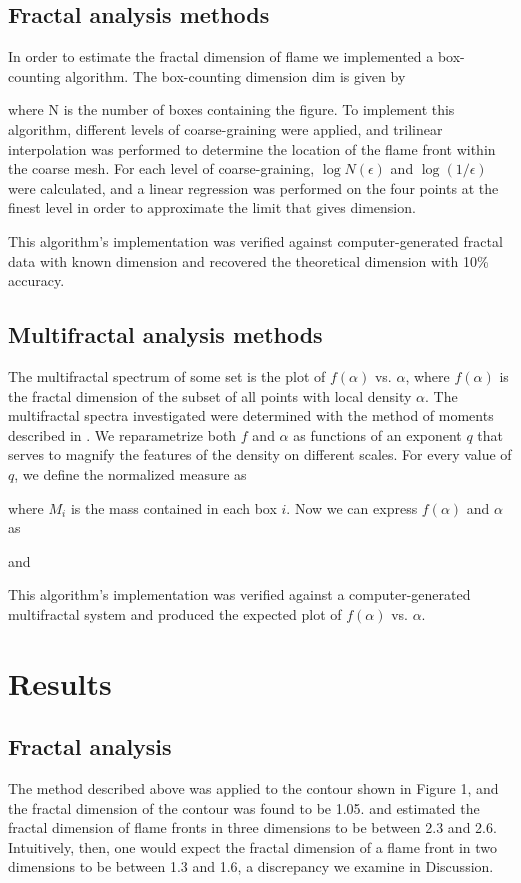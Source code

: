 \documentclass[iop]{emulateapj}
\begin{document}
\subsection{Fractal analysis methods}\label{FractalMethods}
In order to estimate the fractal dimension of flame we implemented a box-counting algorithm. The box-counting dimension $\mathrm{dim}$ is given by

where N is the number of boxes containing the figure.  To implement this algorithm, different levels of coarse-graining were applied, and trilinear interpolation was performed to determine the location of the flame front within the coarse mesh. For each level of coarse-graining, $\log{N(\epsilon)}$ and $\log{(1/\epsilon)}$ were calculated, and a linear regression was performed on the four points at the finest level in order to approximate the limit that gives dimension.

This algorithm’s implementation was verified against computer-generated fractal data with known dimension and recovered the theoretical dimension with 10\% accuracy.

\subsection{Multifractal analysis methods}\label{MultifractalMethods}
The multifractal spectrum of some set is the plot of $f(\alpha)$ vs. $\alpha$, where $f(\alpha)$ is the fractal dimension of the subset of all points with local density $\alpha$. The multifractal spectra investigated were determined with the method of moments described in \cite{Chhabra1989}. We reparametrize both $f$ and $\alpha$ as functions of an exponent $q$ that serves to magnify the features of the density on different scales. For every value of $q$, we define the normalized measure as

where $M_i$ is the mass contained in each box $i$. Now we can express $f(\alpha)$ and $\alpha$ as

and

This algorithm’s implementation was verified against a computer-generated multifractal system and produced the expected plot of $f(\alpha)$ vs. $\alpha$.

\section{Results}\label{Results}

\subsection{Fractal analysis}\label{FractalResults}
The method described above was applied to the contour shown in Figure 1, and the fractal dimension of the contour was found to be 1.05. \cite{Timmes1994} and \cite{Blinnikov1996} estimated the fractal dimension of flame fronts in three dimensions to be between 2.3 and 2.6. Intuitively, then, one would expect the fractal dimension of a flame front in two dimensions to be between 1.3 and 1.6, a discrepancy we examine in Discussion.
\end{document}
